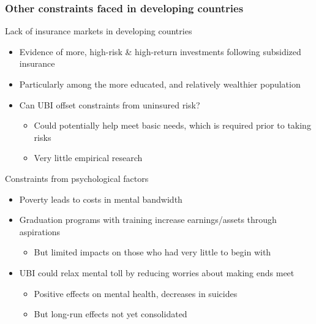 \documentclass[aspectratio=169]{beamer}
\begin{document}
\begin{frame}
\frametitle{Other constraints faced in developing countries} 
Lack of insurance markets in developing countries
\begin{itemize}\setlength\itemsep{3pt}
\item Evidence of more, high-risk \& high-return investments following subsidized insurance
\item Particularly among the more educated, and relatively wealthier population
\item Can UBI offset constraints from uninsured risk?
\begin{itemize}\setlength\itemsep{3pt}
\item Could potentially help meet basic needs, which is required prior to taking risks
\item Very little empirical research
\end{itemize}
\end{itemize}\medskip
Constraints from psychological factors
\begin{itemize}\setlength\itemsep{3pt}
\item Poverty leads to costs in mental bandwidth
\item Graduation programs with training increase earnings/assets through aspirations
\begin{itemize}\setlength\itemsep{3pt}
\item But limited impacts on those who had very little to begin with
\end{itemize}
\item UBI could relax mental toll by reducing worries about making ends meet
\begin{itemize}\setlength\itemsep{3pt}
\item Positive effects on mental health, decreases in suicides
\item But long-run effects not yet consolidated
\end{itemize}
\end{itemize}
\end{frame}
\end{document}
